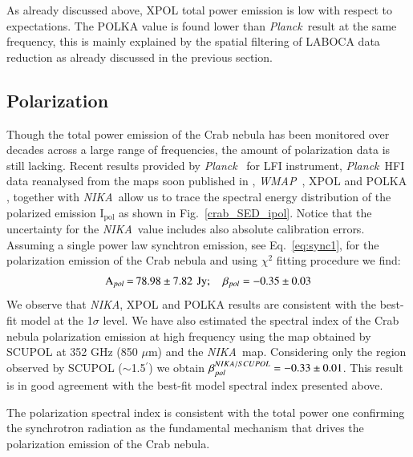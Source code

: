\documentclass[twocolumn,traditabstract]{aa}
\def\NIKA{\textit{NIKA}}
\def\Planck{\textit{Planck}}
\def\WMAP{\textit{WMAP}}
\begin{document}
As already discussed above, XPOL total power emission is low with respect to expectations.
The POLKA value is found lower than \Planck\ result at the same frequency, this is mainly explained by the spatial filtering of LABOCA data reduction as already discussed in the previous section.
  


\subsection{Polarization}
Though the total power emission of the Crab nebula has been monitored over decades across a large range of frequencies, the amount of polarization data is still lacking.
Recent results provided by
\Planck\ \citep{2015arXiv150702058P} for LFI instrument, \Planck\ HFI data reanalysed from the maps soon published in \cite{planck2018}, \WMAP\ \citep{2011ApJS..192...19W},
XPOL \citep{aumont2010} and POLKA \citep{2014PASP..126.1027W}, together with \NIKA\ allow us to trace the spectral energy distribution of the polarized emission I$_{\textrm{pol}}$ as shown in Fig.~\ref{crab_SED_ipol}.  
Notice that the uncertainty for the \NIKA\ value includes also absolute calibration errors.  
Assuming a single power law synchtron emission, see Eq.~\ref{eq:sync1}, for the polarization emission of the Crab nebula and using $\chi^2$ fitting procedure we find:
$$
\setlength\arraycolsep{0.1em}
 \begin{array}{rclcl}
  \textrm{A$_{pol}$}&=& 78.98\pm7.82 & & \textrm{Jy}; \quad \textrm{$\beta_{pol}$} = - 0.35\pm0.03\\
 \end{array}
 $$
We observe that \NIKA, XPOL and POLKA results are consistent with the best-fit model at the 1$\sigma$ level.
We have also estimated the spectral index of the Crab nebula polarization
emission at high frequency using the map obtained by SCUPOL \citep{scubapol} at 352 GHz (850
$\mu$m) and the \NIKA\ map. Considering only the region observed by SCUPOL ($\sim$1.5$^{\prime}$) we
obtain $\beta_{pol}^{\small NIKA/SCUPOL} = -0.33 \pm 0.01$.
This result is in good agreement with the best-fit model spectral index presented above.

The polarization spectral index is consistent with the total power one confirming the synchrotron radiation as the fundamental mechanism that drives the polarization emission of the Crab nebula.
\end{document}
